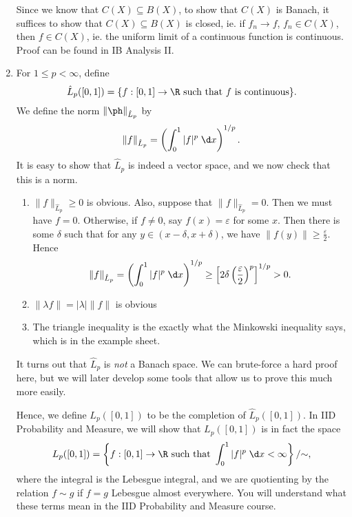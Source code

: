 \documentclass[a4paper]{article}
\begin{document}
\begin{eg}
\begin{enumerate}
      Since we know that $C(X)\subseteq B(X)$, to show that $C(X)$ is Banach, it suffices to show that $C(X) \subseteq B(X)$ is closed, ie. if $f_n \to f$, $f_n \in C(X)$, then $f\in C(X)$, ie. the uniform limit of a continuous function is continuous. Proof can be found in IB Analysis II.
    \item For $1 \leq p < \infty$, define
      \[
        \hat{L}_p ([0, 1]) = \{f: [0, 1] \to \R \text{ such that }f\text{ is continuous}\}.
      \]
      We define the norm $\|\ph \|_{\hat{L}_p}$ by
      \[
        \|f\|_{\hat{L}_p} = \left(\int_0^1 |f|^p \;\d x\right)^{1/p}.
      \]
      It is easy to show that $\hat{L}_p$ is indeed a vector space, and we now check that this is a norm.
      \begin{enumerate}
        \item $\|f\|_{\hat{L}_p} \geq 0$ is obvious. Also, suppose that $\|f\|_{\hat{L}_p} = 0$. Then we must have $f = 0$. Otherwise, if $f\not = 0$, say $f(x) = \varepsilon$ for some $x$. Then there is some $\delta$ such that for any $y\in (x - \delta, x + \delta)$, we have $\|f(y)\| \geq \frac{\varepsilon}{2}$. Hence
          \[
            \|f\|_{\hat{L}_p} = \left(\int_0^1 |f|^p \;\d x\right)^{1/p} \geq \left[2\delta\left(\frac{\varepsilon}{2}\right)^p\right]^{1/p} > 0.
          \]
        \item $\|\lambda f\| = |\lambda|\|f\|$ is obvious
        \item The triangle inequality is the exactly what the Minkowski inequality says, which is in the example sheet.
      \end{enumerate}
      It turns out that $\hat{L}_p$ is \emph{not} a Banach space. We can brute-force a hard proof here, but we will later develop some tools that allow us to prove this much more easily.

      Hence, we define $L_p([0, 1])$ to be the completion of $\hat{L}_p ([0, 1])$. In IID Probability and Measure, we will show that $L_p([0, 1])$ is in fact the space
      \[
        L_p([0, 1]) = \left\{f: [0, 1] \to \R\text{ such that } \int_0^1 |f|^p \;\d x < \infty\right\}/{\sim},
      \]
      where the integral is the Lebesgue integral, and we are quotienting by the relation $f\sim g$ if $f = g$ Lebesgue almost everywhere. You will understand what these terms mean in the IID Probability and Measure course.


\end{enumerate}
\end{eg}
\end{document}
